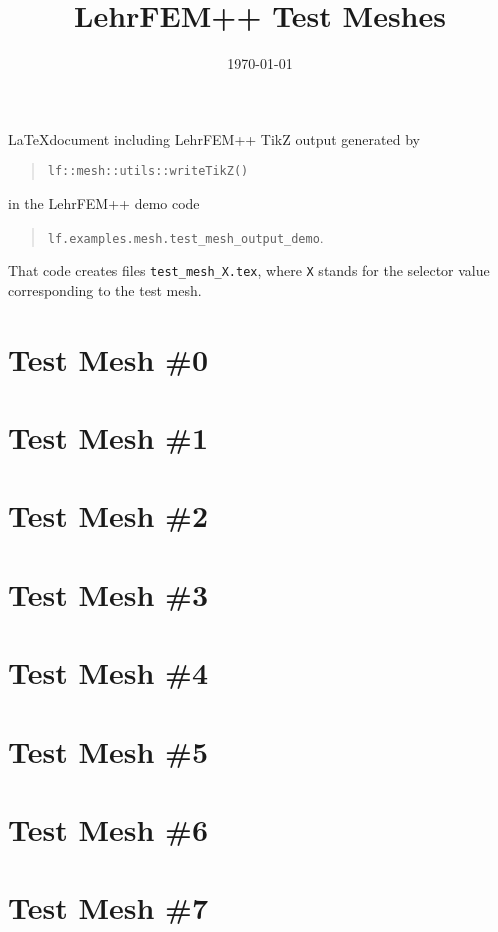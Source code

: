 \documentclass[a4wide]{article}
\title{LehrFEM++ Test Meshes}
\date{\today}
\begin{document}
\maketitle

\noindent
\LaTeX document including LehrFEM++ TikZ output generated by
\begin{quote}
  \texttt{lf::mesh::utils::writeTikZ()}
\end{quote}
in the LehrFEM++ demo code
\begin{quote}
  \texttt{lf.examples.mesh.test\_mesh\_output\_demo}.
\end{quote}
That code creates
files \texttt{test\_mesh\_X.tex}, where \texttt{X} stands for the
selector value corresponding to the test mesh.

\section*{Test Mesh \#0}

\resizebox{\linewidth}{!}{}

\section*{Test Mesh \#1}

\resizebox{\linewidth}{!}{}

\section*{Test Mesh \#2}

\resizebox{\linewidth}{!}{}

\section*{Test Mesh \#3}

\resizebox{\linewidth}{!}{}

\section*{Test Mesh \#4}

\resizebox{\linewidth}{!}{}

\section*{Test Mesh \#5}

\resizebox{\linewidth}{!}{}

\section*{Test Mesh \#6}

\resizebox{\linewidth}{!}{}

\section*{Test Mesh \#7}

\resizebox{\linewidth}{!}{}
\end{document}
